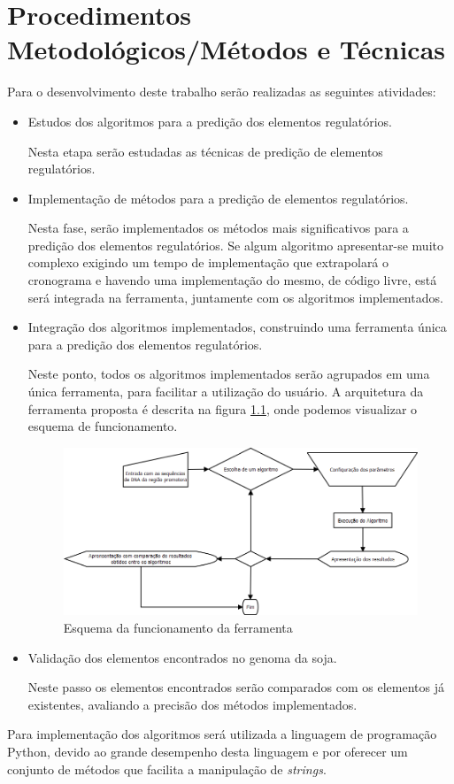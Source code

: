 \chapter{Procedimentos Metodológicos/Métodos e Técnicas}

Para o desenvolvimento deste trabalho serão realizadas as seguintes atividades:

\begin{itemize}

 \item Estudos dos algoritmos para a predição dos elementos regulatórios.

 Nesta etapa serão estudadas as técnicas de predição de elementos regulatórios.

 \item Implementação de métodos para a predição de elementos regulatórios.

Nesta fase, serão implementados os métodos mais significativos para a predição dos elementos regulatórios. Se algum algoritmo apresentar-se muito complexo exigindo um tempo de implementação que extrapolará o cronograma e havendo uma implementação do mesmo, de código livre, está será integrada na ferramenta, juntamente com os algoritmos implementados.


\item Integração dos algoritmos implementados, construindo uma ferramenta única para a predição dos elementos regulatórios.

Neste ponto, todos os algoritmos implementados serão agrupados em uma única ferramenta, para facilitar a utilização do usuário. A arquitetura da ferramenta proposta é descrita na figura \ref{fig:exec_alg}, onde podemos visualizar o esquema de funcionamento.

\begin{figure}[htb!]
    \centering
    \includegraphics[scale=0.5]{./imagens/exec_alg.png}
    \caption{Esquema da funcionamento da ferramenta}
    \label{fig:exec_alg}
\end{figure}

 \item Validação dos elementos encontrados no genoma da soja.

Neste passo os elementos encontrados serão comparados com os elementos já existentes, avaliando a precisão dos métodos implementados.

\end{itemize}

Para implementação dos algoritmos será utilizada a linguagem de programação Python, devido ao grande desempenho desta linguagem e por oferecer um conjunto de métodos que facilita a manipulação de \textit{strings}.
